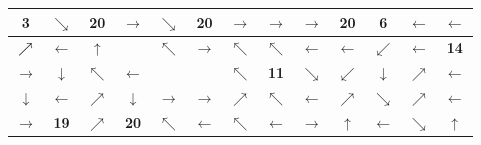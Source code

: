 \begin{center}
\begin{minipage}{\textwidth}
\renewcommand{\arraystretch}{1.4}
\begin{table}[H]
\centering 
\begin{scriptsize}
\begin{tabular}{|>{}c|>{}c|>{}c|>{}c|>{}c|>{}c|>{}c|>{}c|>{}c|>{}c|>{}c|>{}c|>{}c|}
\hline
\bf{3}&\cellcolor{red!15!white}$\searrow$&\cellcolor{red!15!white}\bf{20}&\cellcolor{blue!15!white}$\rightarrow$&
\cellcolor{blue!15!white}$\searrow$&\cellcolor{blue!15!white}\bf{20}&\cellcolor{green!15!white}$\rightarrow$&\cellcolor{green!15!white}$\rightarrow$&\cellcolor{green!15!white}$\rightarrow$&\cellcolor{green!15!white}\bf{20}&\cellcolor{yellow!15!white}\bf{6}&\cellcolor{yellow!15!white}$\leftarrow$&\cellcolor{yellow!15!white}$\leftarrow$\\
\hline
$\cellcolor{red!15!white}\nearrow$&\cellcolor{red!15!white}$\leftarrow$&\cellcolor{red!15!white}$\uparrow$&\cellcolor{gray!50!white} &
\cellcolor{blue!15!white}$\nwarrow$&\cellcolor{blue!15!white}$\rightarrow$&\cellcolor{blue!15!white}$\nwarrow$&\cellcolor{green!15!white}$\nwarrow$&\cellcolor{green!15!white}$\leftarrow$&
\cellcolor{green!15!white}$\leftarrow$&\cellcolor{blue!15!white}$\swarrow$&\cellcolor{blue!15!white}$\leftarrow$&\cellcolor{red!15!white}\bf{14} \\
\hline
\cellcolor{green!15!white}$\rightarrow$&\cellcolor{green!15!white}$\downarrow$&\cellcolor{red!15!white}$\nwarrow$&\cellcolor{red!15!white}$\leftarrow$&
\cellcolor{gray!50!white} &\cellcolor{gray!50!white} &\cellcolor{blue!15!white}$\nwarrow$&\cellcolor{yellow!15!white}\bf{11}&$\searrow$ &\cellcolor{blue!15!white}$\swarrow$&$\downarrow$&\cellcolor{red!15!white}$\nearrow$&\cellcolor{red!15!white}$\leftarrow$ \\
\hline
\cellcolor{green!15!white}$\downarrow$&\cellcolor{green!15!white}$\leftarrow$&\cellcolor{red!15!white}$\nearrow$&\cellcolor{blue!15!white}$\downarrow$&\cellcolor{yellow!15!white}
$\rightarrow$&\cellcolor{yellow!15!white}$\rightarrow$&\cellcolor{yellow!15!white}$\nearrow$&\cellcolor{blue!15!white}$\nwarrow$&\cellcolor{blue!15!white}$\leftarrow$ 
&$\nearrow$&$\searrow$&\cellcolor{red!15!white}$\nearrow$&\cellcolor{red!15!white}$\leftarrow$ \\
\hline
\cellcolor{green!15!white}$\rightarrow$&\cellcolor{green!15!white}\bf{19}&\cellcolor{blue!15!white}$\nearrow$&\cellcolor{blue!15!white}\bf{20}&
\cellcolor{blue!15!white}$\nwarrow$&\cellcolor{blue!15!white}$\leftarrow$&\cellcolor{yellow!15!white}$\nwarrow$&\cellcolor{yellow!15!white}$\leftarrow$&$\rightarrow$ &$\uparrow$&$\leftarrow$&$\searrow$&\cellcolor{red!15!white}$\uparrow$\\

\end{tabular}
\end{scriptsize}
\end{table}
\end{minipage}
\end{center}
